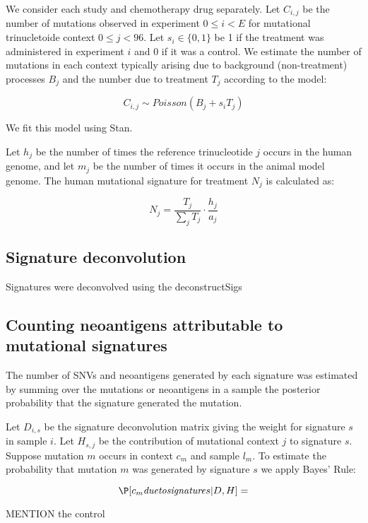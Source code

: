 We consider each study and chemotherapy drug separately. Let $C_{i,j}$ be the number of mutations observed in experiment $0 \leq i \lt E$ for mutational trinucletoide context $0 \leq j \lt 96$. Let $s_i \in \{0,1\}$ be 1 if the treatment was administered in experiment $i$ and 0 if it was a control. We estimate the number of mutations in each context typically arising due to background (non-treatment) processes $B_j$ and the number due to treatment $T_j$ according to the model:

\[
C_{i,j} \sim \mathit{Poisson}(B_j + s_i T_j)
\]

We fit this model using Stan\cite{Gelman_2015}.

Let $h_j$ be the number of times the reference trinucleotide $j$ occurs in the human genome, and let $m_j$ be the number of times it occurs in the animal model genome. The human mutational signature for treatment $N_j$ is calculated as:

\[
N_j = \frac{T_j}{\sum_j{T_j}} \cdot \frac{h_j}{a_j}
\]


\subsection*{Signature deconvolution}
Signatures were deconvolved using the deconstructSigs\cite{Rosenthal_2016}

\subsection*{Counting neoantigens attributable to mutational signatures}
The number of SNVs and neoantigens generated by each signature was estimated by summing over the mutations or neoantigens in a sample the posterior probability that the signature generated the mutation.

Let $D_{i,s}$ be the signature deconvolution matrix giving the weight for signature $s$ in sample $i$. Let $H_{s,j}$ be the contribution of mutational context $j$ to signature $s$. Suppose mutation $m$ occurs in context $c_m$ and sample $l_m$. To estimate the probability that mutation $m$ was generated by signature $s$ we apply Bayes' Rule:

\[

\P[c_m \mathit{due to signature} s | D,H ] = 

\]


MENTION the control




